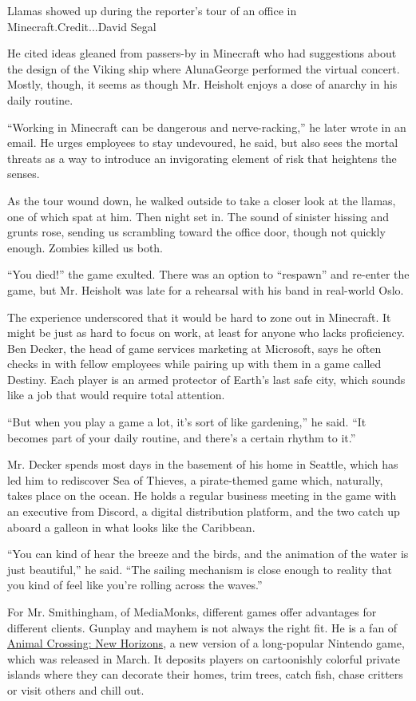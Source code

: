 Llamas showed up during the reporter's tour of an office in
Minecraft.Credit...David Segal

He cited ideas gleaned from passers-by in Minecraft who had suggestions
about the design of the Viking ship where AlunaGeorge performed the
virtual concert. Mostly, though, it seems as though Mr. Heisholt enjoys
a dose of anarchy in his daily routine.

``Working in Minecraft can be dangerous and nerve-racking,'' he later
wrote in an email. He urges employees to stay undevoured, he said, but
also sees the mortal threats as a way to introduce an invigorating
element of risk that heightens the senses.

As the tour wound down, he walked outside to take a closer look at the
llamas, one of which spat at him. Then night set in. The sound of
sinister hissing and grunts rose, sending us scrambling toward the
office door, though not quickly enough. Zombies killed us both.

``You died!'' the game exulted. There was an option to ``respawn'' and
re-enter the game, but Mr. Heisholt was late for a rehearsal with his
band in real-world Oslo.

The experience underscored that it would be hard to zone out in
Minecraft. It might be just as hard to focus on work, at least for
anyone who lacks proficiency. Ben Decker, the head of game services
marketing at Microsoft, says he often checks in with fellow employees
while pairing up with them in a game called Destiny. Each player is an
armed protector of Earth's last safe city, which sounds like a job that
would require total attention.

``But when you play a game a lot, it's sort of like gardening,'' he
said. ``It becomes part of your daily routine, and there's a certain
rhythm to it.''

Mr. Decker spends most days in the basement of his home in Seattle,
which has led him to rediscover Sea of Thieves, a pirate-themed game
which, naturally, takes place on the ocean. He holds a regular business
meeting in the game with an executive from Discord, a digital
distribution platform, and the two catch up aboard a galleon in what
looks like the Caribbean.

``You can kind of hear the breeze and the birds, and the animation of
the water is just beautiful,'' he said. ``The sailing mechanism is close
enough to reality that you kind of feel like you're rolling across the
waves.''

For Mr. Smithingham, of MediaMonks, different games offer advantages for
different clients. Gunplay and mayhem is not always the right fit. He is
a fan of
\href{https://www.nytimes3xbfgragh.onion/2020/04/07/arts/animal-crossing-covid-coronavirus-popularity-millennials.html}{Animal
Crossing: New Horizons}, a new version of a long-popular Nintendo game,
which was released in March. It deposits players on cartoonishly
colorful private islands where they can decorate their homes, trim
trees, catch fish, chase critters or visit others and chill out.

